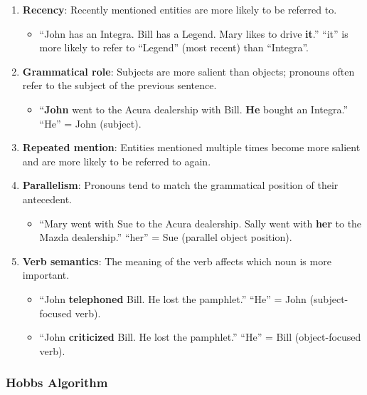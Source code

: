 \documentclass[11pt,a4paper]{article}
\begin{document}
\begin{enumerate}
    \item \textbf{Recency}: Recently mentioned entities are more likely to be referred to.
    \begin{itemize}
        \item ``John has an Integra. Bill has a Legend. Mary likes to drive \textbf{it}.'' ``it'' is more likely to refer to ``Legend'' (most recent) than ``Integra''.
    \end{itemize}
    
    \item \textbf{Grammatical role}: Subjects are more salient than objects; pronouns often refer to the subject of the previous sentence.
    \begin{itemize}
        \item ``\textbf{John} went to the Acura dealership with Bill. \textbf{He} bought an Integra.'' ``He'' = John (subject).
    \end{itemize}
    
    \item \textbf{Repeated mention}: Entities mentioned multiple times become more salient and are more likely to be referred to again.
    
    \item \textbf{Parallelism}: Pronouns tend to match the grammatical position of their antecedent.
    \begin{itemize}
        \item ``Mary went with Sue to the Acura dealership. Sally went with \textbf{her} to the Mazda dealership.'' ``her'' = Sue (parallel object position).
    \end{itemize}
    
    \item \textbf{Verb semantics}: The meaning of the verb affects which noun is more important.
    \begin{itemize}
        \item ``John \textbf{telephoned} Bill. He lost the pamphlet.'' ``He'' = John (subject-focused verb).
        \item ``John \textbf{criticized} Bill. He lost the pamphlet.'' ``He'' = Bill (object-focused verb).
    \end{itemize}
\end{enumerate}

\subsubsection{Hobbs Algorithm}
\end{document}

